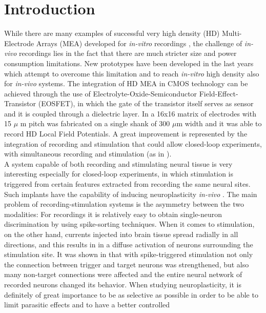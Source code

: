 \documentclass[conference]{IEEEtran}
\begin{document}
\section{Introduction}
While there are many examples of successful very high density (HD)
Multi-Electrode Arrays (MEA) developed for \emph{in-vitro} recordings
\cite{berdondini2014active}\cite{muller2015high}, the challenge
of \emph{in-vivo} recordings lies in the fact that there are much
stricter size and power consumption limitations. New prototypes have
been developed in the last years which attempt to overcome this limitation
and to reach \emph{in-vitro} high density also for\emph{ in-vivo}
systems. The integration of HD MEA in CMOS technology can be achieved
through the use of Electrolyte-Oxide-Semiconductor Field-Effect-Transistor
(EOSFET), in which the gate of the transistor itself serves as sensor
and it is coupled through a dielectric layer. In \cite{schroder2015cmos}
a 16x16 matrix of electrodes with 15 $\mu$ m pitch was fabricated
on a single shank of 300 $\mu$m width and it was able to record
HD Local Field Potentials. A great improvement is represented by the
integration of recording and stimulation that could allow closed-loop
experiments, with simultaneous recording and stimulation (as in \cite{ha2014energy}).
\\
A system capable of both recording and stimulating neural tissue is
very interesting especially for closed-loop experiments, in which
stimulation is triggered from certain features extracted from recording
the same neural sites. Such implants have the capability of inducing
neuroplasticity \emph{in-vivo} \cite{jackson2006long}\cite{guggenmos2013restoration}.
The main problem of recording-stimulation systems is the asymmetry between the two modalities: For recordings it is relatively easy to obtain single-neuron discrimination by using spike-sorting techniques. When it comes to stimulation, on the other hand, currents injected into brain tissue spread radially in all directions, and this results in in a diffuse activation of neurons surrounding
the stimulation site. It was shown in \cite{rebesco2010rewiring}
that with spike-triggered stimulation not only the connection between
trigger and target neurons was strengthened, but also many non-target
connections were affected and the entire neural network of recorded
neurons changed its behavior. When studying neuroplasticity, it is
definitely of great importance to be as selective as possible in order
to be able to limit parasitic effects and to have a better controlled
\end{document}
